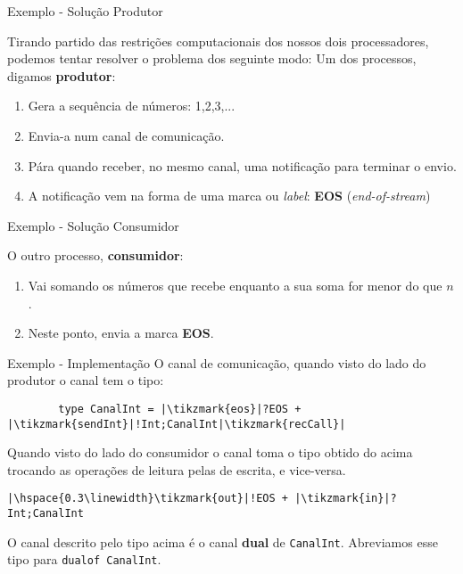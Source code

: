 \begin{frame}{Exemplo - Solução \hfill \color{mLightBrown}Produtor}

  Tirando partido das restrições computacionais dos nossos dois processadores, podemos tentar resolver o problema dos seguinte modo:
 Um dos processos, digamos \textbf{produtor}:
  \begin{enumerate}
  \item Gera a sequência de números: 1,2,3,...
  \item Envia-a num canal de comunicação.
  \item Pára quando receber, no mesmo canal, uma notificação para terminar o envio.
  \item A notificação vem na forma de uma marca ou \textit{label}: \textbf{EOS} (\textit{end-of-stream})
  \end{enumerate}

\end{frame}


\begin{frame}{Exemplo - Solução \hfill \color{mLightBrown}Consumidor}

  O outro processo, \textbf{consumidor}:
  \begin{enumerate}
  \item Vai somando os números que recebe enquanto a sua soma for menor do que $n$.
  \item Neste ponto, envia a marca \textbf{EOS}.
  \end{enumerate}
\end{frame}

\begin{frame}[fragile]{Exemplo - Implementação}
  O canal de comunicação, quando visto do lado do produtor o canal tem o tipo:
  \vspace*{4mm}
  \begin{lstlisting}
        type CanalInt = |\tikzmark{eos}|?EOS + |\tikzmark{sendInt}|!Int;CanalInt|\tikzmark{recCall}|
\end{lstlisting} 



 Quando visto do lado do consumidor o canal toma o tipo obtido do acima trocando as operações de leitura pelas de escrita, e vice-versa.
\vspace*{4mm}
\begin{lstlisting}
|\hspace{0.3\linewidth}\tikzmark{out}|!EOS + |\tikzmark{in}|?Int;CanalInt
\end{lstlisting}


\centering
\begin{tcolorbox}
  O canal descrito pelo tipo acima é o canal \textbf{dual} de \lstinline|CanalInt|. Abreviamos esse tipo para \lstinline|dualof CanalInt|.
\end{tcolorbox}

\end{frame}



